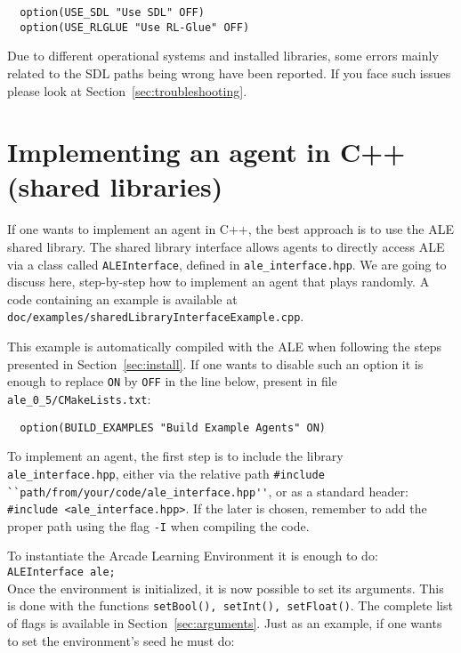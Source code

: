 \documentclass[12pt]{article}
\begin{document}

\begin{verbatim}
  option(USE_SDL "Use SDL" OFF)
  option(USE_RLGLUE "Use RL-Glue" OFF)
\end{verbatim}

Due to different operational systems and installed libraries, some errors mainly related to the SDL 
paths being wrong have been reported. If you face such issues please look at 
Section~\ref{sec:troubleshooting}.

\section{Implementing an agent in C++ (shared libraries)} \label{sec:shared_library_interface}

If one wants to implement an agent in C++, the best approach is to use the ALE shared library. 
The shared library interface allows agents to directly access ALE via a class called
\verb+ALEInterface+, defined in \verb+ale_interface.hpp+. We are going to discuss here, 
step-by-step how to implement an agent that plays randomly. A code containing an example is
available at \verb+doc/examples/sharedLibraryInterfaceExample.cpp+.

This example is automatically compiled with the ALE when following the steps presented in
Section~\ref{sec:install}. If one wants to disable such an option it is enough to replace \verb+ON+ 
by \verb+OFF+ in the line below, present in file \verb+ale_0_5/CMakeLists.txt+:

\begin{verbatim}
  option(BUILD_EXAMPLES "Build Example Agents" ON)
\end{verbatim}

To implement an agent, the first step is to include the library \verb+ale_interface.hpp+, either via 
the relative path \verb+#include ``path/from/your/code/ale_interface.hpp''+, or as a standard 
header: \verb+#include <ale_interface.hpp>+. If the later is chosen, remember to add the proper 
path using the flag \verb+-I+ when compiling the code.

To instantiate the Arcade Learning Environment it is enough to do:\\

\verb+ALEInterface ale;+\\

Once the environment is initialized, it is now possible to set its arguments. This is done with the 
functions \verb+setBool(), setInt(), setFloat()+. The complete list of flags is available in 
Section~\ref{sec:arguments}. Just as an example, if one wants to set the environment's seed he must 
do:\\
\end{document}
